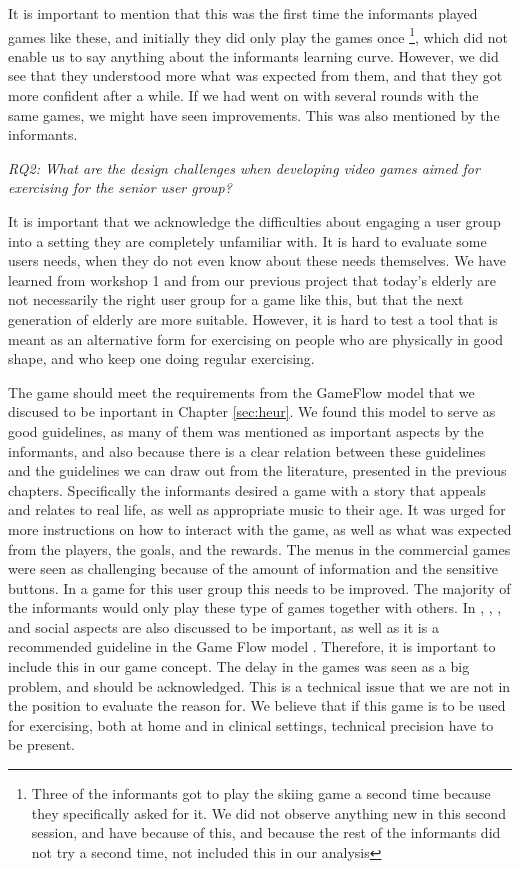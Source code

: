 It is important to mention that this was the first time the informants played games like these, and initially they did only play the games once \footnote{Three of the informants got to play the skiing game a second time because they specifically asked for it. We did not observe anything new in this second session, and have because of this, and because the rest of the informants did not try a second time, not included this in our analysis}, which did not enable us to say anything about the informants learning curve. However, we did see that they understood more what was expected from them, and that they got more confident after a while. If we had went on with several rounds with the same games, we might have seen improvements. This was also mentioned by the informants. 

\emph{RQ2: What are the design challenges when developing video games aimed for exercising for the senior user group?}

It is important that we acknowledge the difficulties about engaging a user group into a setting they are completely unfamiliar with. It is hard to evaluate some users needs, when they do not even know about these needs themselves. We have learned from workshop 1 and from our previous project that today's elderly are not necessarily the right user group for a game like this, but that the next generation of elderly are more suitable. However, it is hard to test a tool that is meant as an alternative form for exercising on people who are physically in good shape, and who keep one doing regular exercising. 

The game should meet the requirements from the GameFlow model \cite{sweetser} that we discused to be inportant in Chapter \ref{sec:heur}. We found this model to serve as good guidelines, as many of them was mentioned as important aspects by the informants, and also because there is a clear relation between these guidelines and the guidelines we can draw out from the literature, presented in the previous chapters. Specifically the informants desired a game with a story that appeals and relates to real life, as well as appropriate music to their age. It was urged for more instructions on how to interact with the game, as well as what was expected from the players, the goals, and the rewards. The menus in the commercial games were seen as challenging because of the amount of information and the sensitive buttons. In a game for this user group this needs to be improved. The majority of the informants would only play these type of games together with others. In \cite{chao}, \cite{statistics2012}, \cite{Billis}, \cite{gerling2} and \cite{gerling1} social aspects are also discussed to be important, as well as it is a recommended guideline in the Game Flow model \cite{sweetser}. Therefore, it is important to include this in our game concept. The delay in the games was seen as a big problem, and should be acknowledged.  This is a technical issue that we are not in the position to evaluate the reason for. We believe that if this game is to be used for exercising, both at home and in clinical settings, technical precision have to be present. 

